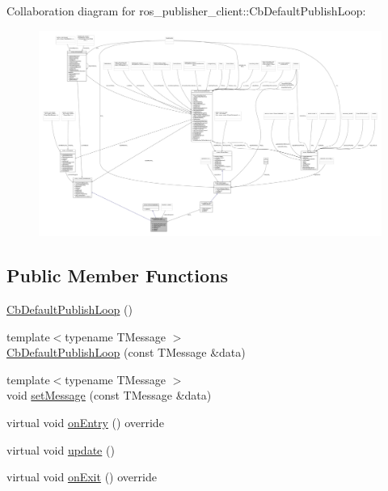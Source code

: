 Collaboration diagram for ros\+\_\+publisher\+\_\+client\+:\+:Cb\+Default\+Publish\+Loop\+:
\nopagebreak
\begin{figure}[H]
\begin{center}
\leavevmode
\includegraphics[width=350pt]{classros__publisher__client_1_1CbDefaultPublishLoop__coll__graph}
\end{center}
\end{figure}
\subsection*{Public Member Functions}
\begin{DoxyCompactItemize}
\item 
\hyperlink{classros__publisher__client_1_1CbDefaultPublishLoop_adef5a847465f4c7f399a25ce37ab2fe5}{Cb\+Default\+Publish\+Loop} ()
\item 
{\footnotesize template$<$typename T\+Message $>$ }\\\hyperlink{classros__publisher__client_1_1CbDefaultPublishLoop_ac7b6e38399dae0fb03f81f23b7de5124}{Cb\+Default\+Publish\+Loop} (const T\+Message \&data)
\item 
{\footnotesize template$<$typename T\+Message $>$ }\\void \hyperlink{classros__publisher__client_1_1CbDefaultPublishLoop_a8bba9039f6a6841c21e9bc89c2fd8ab7}{set\+Message} (const T\+Message \&data)
\item 
virtual void \hyperlink{classros__publisher__client_1_1CbDefaultPublishLoop_ada860aab5d8887e8671a6ae7f4b22e76}{on\+Entry} () override
\item 
virtual void \hyperlink{classros__publisher__client_1_1CbDefaultPublishLoop_aac7546e32e37fd833eac47d3976463b3}{update} ()
\item 
virtual void \hyperlink{classros__publisher__client_1_1CbDefaultPublishLoop_a47605e0cb9236077c9d9b0c42db9708c}{on\+Exit} () override
\end{DoxyCompactItemize}
